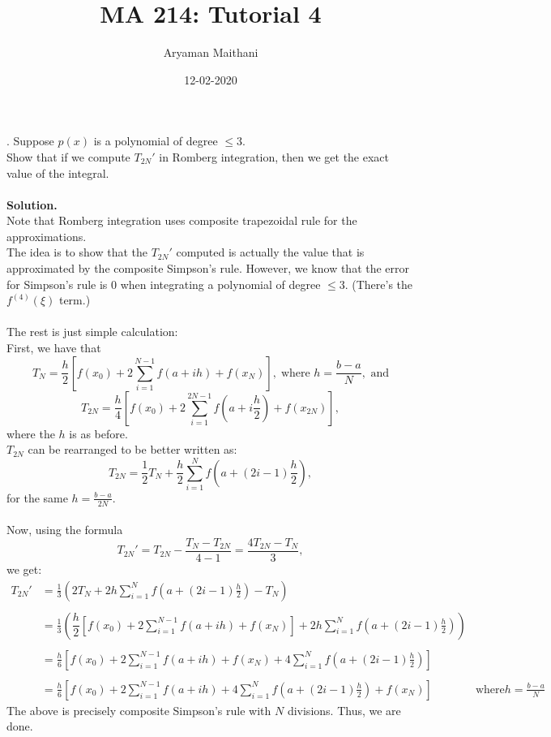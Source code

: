 \documentclass{article}
\title{MA 214: Tutorial 4}
\author{Aryaman Maithani}
\date{12-02-2020}
\begin{document}
. Suppose $p(x)$ is a polynomial of degree $\le 3.$\\
Show that if we compute $T_{2N}'$ in Romberg integration, then we get the exact value of the integral.\\~\\
\textbf{Solution.}\\
Note that Romberg integration uses composite trapezoidal rule for the approximations.\\
The idea is to show that the $T_{2N}'$ computed is actually the value that is approximated by the composite Simpson's rule. However, we know that the error for Simpson's rule is $0$ when integrating a polynomial of degree $\le 3.$ (There's the $f^{(4)}(\xi)$ term.)\\~\\
The rest is just simple calculation:\\
First, we have that 
\[T_N = \dfrac{h}{2}\left[f(x_0) + 2\displaystyle\sum_{i=1}^{N-1}f(a + ih) + f(x_N)\right],\;\text{where } h = \frac{b - a}{N}, \text{ and}\]
\[T_{2N} = \dfrac{h}{4}\left[f(x_0) + 2\displaystyle\sum_{i=1}^{2N-1}f\left(a + i\frac{h}{2}\right) + f(x_{2N})\right],\]
where the $h$ is as before.\\
$T_{2N}$ can be rearranged to be better written as:
\[T_{2N} = \frac{1}{2}T_{N} + \frac{h}{2}\sum_{i=1}^{N}f\left(a + (2i - 1)\frac{h}{2}\right),\]
for the same $h = \frac{b - a}{2N}.$\\~\\
Now, using the formula
\[T_{2N}' = T_{2N} - \frac{T_N - T_{2N}}{4 - 1} = \frac{4T_{2N} - T_N}{3},\]
we get:
\begin{align*} 
	T_{2N}' &= \frac{1}{3}\left(2T_N + 2h\sum_{i=1}^{N}f\left(a + (2i - 1)\frac{h}{2}\right) - T_N\right)\\~\\
	&= \frac{1}{3}\left(\dfrac{h}{2}\left[f(x_0) + 2\displaystyle\sum_{i=1}^{N-1}f(a + ih) + f(x_N)\right] + 2h\sum_{i=1}^{N}f\left(a + (2i - 1)\frac{h}{2}\right)\right)\\~\\
	&= \frac{h}{6}\left[f(x_0) + 2\displaystyle\sum_{i=1}^{N-1}f(a + ih) + f(x_N) + 4\sum_{i=1}^{N}f\left(a + (2i - 1)\frac{h}{2}\right)\right]\\~\\
	&= \frac{h}{6}\left[f(x_0) + 2\displaystyle\sum_{i=1}^{N-1}f(a + ih) + 4\sum_{i=1}^{N}f\left(a + (2i - 1)\frac{h}{2}\right) + f(x_N)\right] & \text{where} h = \frac{b - a}{N}
\end{align*}
The above is precisely composite Simpson's rule with $N$ divisions. Thus, we are done.
\end{document}

